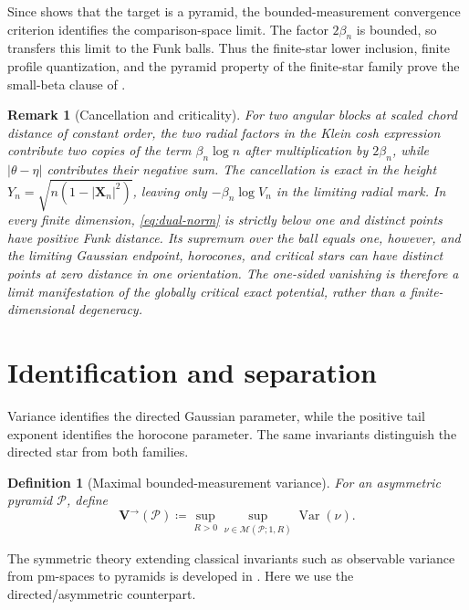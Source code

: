 \documentclass[10pt,a4paper]{amsart}
\numberwithin{equation}{section}
\newtheorem{definition}[theorem]{Definition}
\newtheorem{remark}[theorem]{Remark}
\newcommand{\Var}{\operatorname{Var}}
\begin{document}
Since  shows that the target is a pyramid, the bounded-measurement convergence criterion identifies the comparison-space limit.  The factor $2\beta_n$ is bounded, so  transfers this limit to the Funk balls.  Thus the finite-star lower inclusion, finite profile quantization, and the pyramid property of the finite-star family prove the small-beta clause of .

\begin{remark}[Cancellation and criticality]\label{rem:cancellation-criticality}
For two angular blocks at scaled chord distance of constant order, the two radial factors in the Klein cosh expression contribute two copies of the term $\beta_n\log n$ after multiplication by $2\beta_n$, while $|\theta-\eta|$ contributes their negative sum.  The cancellation is exact in the height $Y_n=\sqrt{n(1-|\mathbf X_n|^2)}$, leaving only $-\beta_n\log V_n$ in the limiting radial mark.  In every finite dimension, \eqref{eq:dual-norm} is strictly below one and distinct points have positive Funk distance.  Its supremum over the ball equals one, however, and the limiting Gaussian endpoint, horocones, and critical stars can have distinct points at zero distance in one orientation.  The one-sided vanishing is therefore a limit manifestation of the globally critical exact potential, rather than a finite-dimensional degeneracy.
\end{remark}

\section{Identification and separation}\label{sec:identification-separation}

Variance identifies the directed Gaussian parameter, while the positive tail exponent identifies the horocone parameter.  The same invariants distinguish the directed star from both families.

\begin{definition}[Maximal bounded-measurement variance]\label{def:variance-invariant}
For an asymmetric pyramid $\mathcal P$, define
\[ \mathbf{V}^{\to}(\mathcal P) \coloneqq\sup_{R>0}\sup_{\nu\in\mathcal M(\mathcal P;1,R)}\Var(\nu). \]
\end{definition}
The symmetric theory extending classical invariants such as observable variance from pm-spaces to pyramids is developed in \cite{esaki-kazukawa-mitsuishi2024invariants}.  Here we use the directed/asymmetric counterpart.
\end{document}
